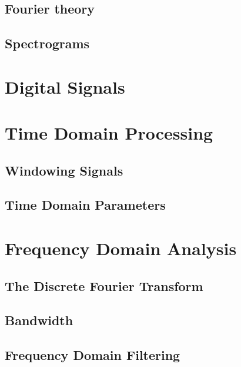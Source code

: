 \subsection{Fourier theory}
\label{sub:fourier_theory}

\subsection{Spectrograms}
\label{sec:spectrograms}



\section{Digital Signals}
\label{sec:digital_signals}



\section{Time Domain Processing}
\label{sub:time_domain_processing}

\subsection{Windowing Signals}
\label{subs:windowing_signals}

\subsection{Time Domain Parameters}
\label{sec:time_domain_params}


\section{Frequency Domain Analysis}
\label{sec:freq_domain_analysis}




\subsection{The Discrete Fourier Transform}
\label{sub:discrete_fourier_transform}

\subsection{Bandwidth}
\label{sub:bandwidth}

\subsection{Frequency Domain Filtering}
\label{sub:frequency_domain_filtering}
